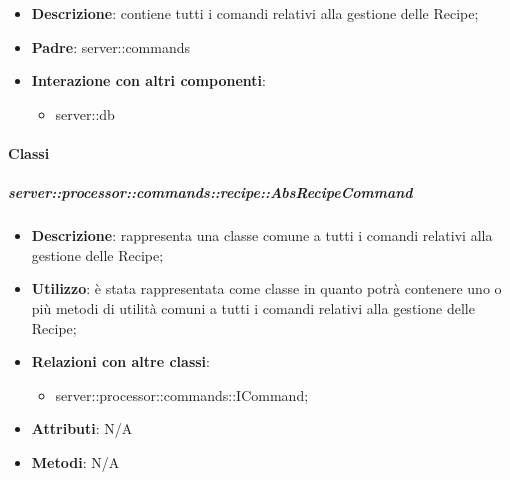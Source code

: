       \begin{itemize}
        \item \textbf{Descrizione}: contiene tutti i comandi relativi alla gestione delle Recipe;
        \item \textbf{Padre}: server::commands
        \item \textbf{Interazione con altri componenti}:
          \begin{itemize}
            \item server::db
          \end{itemize}
      \end{itemize}

        \paragraph{Classi} %

        \subparagraph{server::processor::commands::recipe::AbsRecipeCommand} %
        \label{subp:bdsm_app_server_processor_commands_recipe_absrecipecommand}
        \begin{itemize}
          \item \textbf{Descrizione}: rappresenta una classe comune a tutti i comandi relativi alla gestione delle Recipe;
          \item \textbf{Utilizzo}: è stata rappresentata come classe in quanto potrà contenere uno o più metodi di utilità comuni a tutti i comandi relativi alla gestione delle Recipe;
          \item \textbf{Relazioni con altre classi}:
            \begin{itemize}
              \item server::processor::commands::ICommand;
            \end{itemize}
          \item \textbf{Attributi}: N/A
          \item \textbf{Metodi}: N/A
        \end{itemize}

